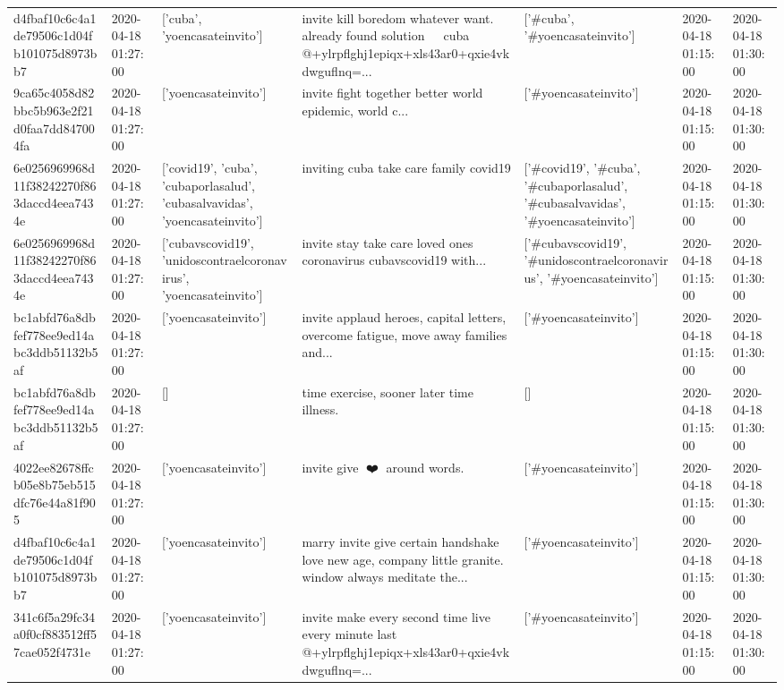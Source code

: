 \begin{tabular}{lllllll}
d4fbaf10c6c4a1de79506c1d04fb101075d8973bb7 & 2020-04-18 01:27:00 & ['cuba', 'yoencasateinvito'] & invite kill boredom whatever want. already found solution 🤣🤣🤣 cuba @+ylrpflghj1epiqx+xls43ar0+qxie4vkdwguflnq=... & ['#cuba', '#yoencasateinvito'] & 2020-04-18 01:15:00 & 2020-04-18 01:30:00 \\
9ca65c4058d82bbc5b963e2f21d0faa7dd847004fa & 2020-04-18 01:27:00 & ['yoencasateinvito'] & invite fight together better world epidemic, world c... & ['#yoencasateinvito'] & 2020-04-18 01:15:00 & 2020-04-18 01:30:00 \\
6e0256969968d11f38242270f863daccd4eea7434e & 2020-04-18 01:27:00 & ['covid19', 'cuba', 'cubaporlasalud', 'cubasalvavidas', 'yoencasateinvito'] & inviting cuba take care family covid19 & ['#covid19', '#cuba', '#cubaporlasalud', '#cubasalvavidas', '#yoencasateinvito'] & 2020-04-18 01:15:00 & 2020-04-18 01:30:00 \\
6e0256969968d11f38242270f863daccd4eea7434e & 2020-04-18 01:27:00 & ['cubavscovid19', 'unidoscontraelcoronavirus', 'yoencasateinvito'] & invite stay take care loved ones coronavirus cubavscovid19 with... & ['#cubavscovid19', '#unidoscontraelcoronavirus', '#yoencasateinvito'] & 2020-04-18 01:15:00 & 2020-04-18 01:30:00 \\
bc1abfd76a8dbfef778ee9ed14abc3ddb51132b5af & 2020-04-18 01:27:00 & ['yoencasateinvito'] & invite applaud heroes, capital letters, overcome fatigue, move away families and... & ['#yoencasateinvito'] & 2020-04-18 01:15:00 & 2020-04-18 01:30:00 \\
bc1abfd76a8dbfef778ee9ed14abc3ddb51132b5af & 2020-04-18 01:27:00 & [] & time exercise, sooner later time illness. & [] & 2020-04-18 01:15:00 & 2020-04-18 01:30:00 \\
4022ee82678ffcb05e8b75eb515dfc76e44a81f905 & 2020-04-18 01:27:00 & ['yoencasateinvito'] & invite give 💚❤️💜 around words. & ['#yoencasateinvito'] & 2020-04-18 01:15:00 & 2020-04-18 01:30:00 \\
d4fbaf10c6c4a1de79506c1d04fb101075d8973bb7 & 2020-04-18 01:27:00 & ['yoencasateinvito'] & marry invite give certain handshake love new age, company little granite. window always meditate the... & ['#yoencasateinvito'] & 2020-04-18 01:15:00 & 2020-04-18 01:30:00 \\
341c6f5a29fc34a0f0cf883512ff57cae052f4731e & 2020-04-18 01:27:00 & ['yoencasateinvito'] & invite make every second time live every minute last @+ylrpflghj1epiqx+xls43ar0+qxie4vkdwguflnq=... & ['#yoencasateinvito'] & 2020-04-18 01:15:00 & 2020-04-18 01:30:00 \\

\end{tabular}
